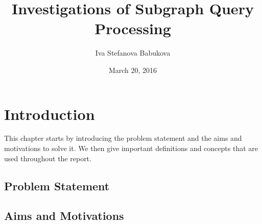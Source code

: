 \documentclass{l4proj}
\begin{document}
\title{Investigations of Subgraph Query Processing}
\author{Iva Stefanova Babukova}
\date{March 20, 2016}
\maketitle

\begin{abstract}


\end{abstract}

\educationalconsent
%
%
\tableofcontents
\chapter{Introduction}
\label{ch:introduction}
This chapter starts by introducing the problem statement and the aims and motivations to solve it. We then give important definitions and concepts that are used throughout the report.

\section{Problem Statement}
\section{Aims and Motivations}  
        
\end{document}
